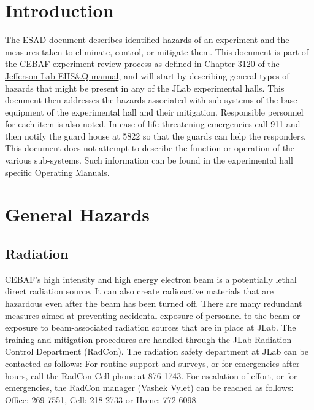
%
%
%

\chapter{Introduction}

The ESAD document describes identified hazards of an experiment and the measures taken to eliminate, control, or mitigate them.
This document is part of the CEBAF experiment review process as defined in
\href{http://www.jlab.org/ehs/ehsmanual/manual/3120.html}{Chapter 3120 of the Jefferson Lab EHS\&Q manual},
and will start by describing general types of hazards that might be present in any of the  
JLab experimental halls.  This document then addresses the hazards associated 
with sub-systems of the base equipment of the experimental hall and their 
mitigation.  Responsible personnel for each item is also noted.  
In case of life threatening 
emergencies call 911 and then notify the guard house at 5822 so that the guards can help
the responders.  This document does not attempt to describe the function 
or operation of the various sub-systems. Such information can be found in
the experimental hall specific Operating Manuals.


\chapter{General Hazards}

\section{Radiation}
	
CEBAF's high intensity and high energy electron beam is a potentially lethal direct radiation source. 
It can also create radioactive materials that are hazardous even  after the beam has been turned off. 
There are many redundant measures aimed at preventing accidental exposure of personnel to the beam 
or exposure to beam-associated radiation sources that are in place at JLab. The training and mitigation 
procedures are handled through the JLab Radiation Control Department (RadCon). The radiation safety 
department at JLab can be contacted as follows: For routine support and surveys, or for emergencies 
after-hours, call the RadCon Cell phone at 876-1743. For escalation of effort, or for emergencies, 
the RadCon manager (Vashek Vylet) can be reached as follows: Office: 269-7551, Cell: 218-2733 or Home: 772-6098.

